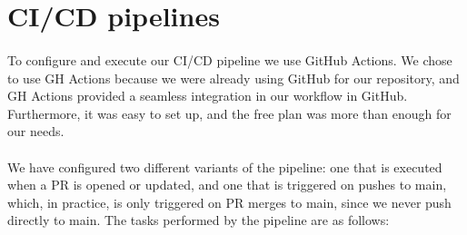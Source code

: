 \section{CI/CD pipelines}
\paragraph{} To configure and execute our CI/CD pipeline we use GitHub Actions. We chose to use GH Actions because we were already using GitHub for our repository, and GH Actions provided a seamless integration in our workflow in GitHub. Furthermore, it was easy to set up, and the free plan was more than enough for our needs.

\paragraph{} We have configured two different variants of the pipeline: one that is executed when a PR is opened or updated, and one that is triggered on pushes to main, which, in practice, is only triggered on PR merges to main, since we never push directly to main. The tasks performed by the pipeline are as follows:
